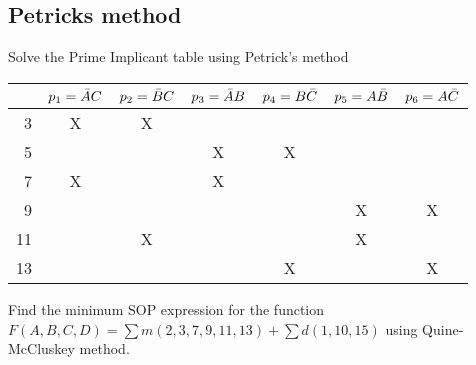 \subsection{Petricks method}

\begin{example}
  Solve the Prime Implicant table using Petrick's method\\
  \begin{tabular}{r|cccccc}
    \toprule
    & $p_1 = \bar{A} C$ & $p_2 = \bar{B} C$ & $p_3 = \bar{A} B$ & $p_4 = B \bar{C}$& $p_5 = A\bar{B}$ & $p_6 = A \bar{C}$ \\
    \midrule
     3 & X & X &   &   &   &   \\
     5 &   &   & X & X &   &   \\
     7 & X &   & X &   &   &   \\
     9 &   &   &   &   & X & X \\
    11 &   & X &   &   & X &   \\
    13 &   &   &   & X &   & X \\
    \bottomrule
  \end{tabular}
\end{example}
\vspace{20em}


\begin{example}
  Find the minimum SOP expression for the function $F (A, B, C, D) = \sum m(2, 3, 7,
  9, 11, 13) + \sum d(1, 10, 15)$ using Quine-McCluskey method.
\end{example}